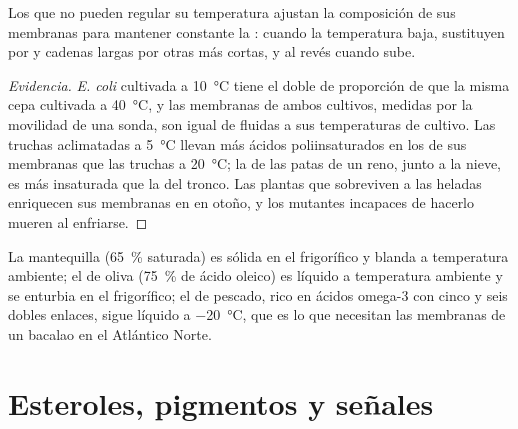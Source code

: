 \begin{proposition}\label{prop:b1:lipids:homeoviscous}
Los  que no pueden regular su temperatura ajustan la composición
de sus membranas para mantener constante la : cuando la temperatura
baja, sustituyen  por  y cadenas largas
por otras más cortas, y al revés cuando sube.
\end{proposition}
\begin{proof}[Evidencia]
\emph{E. coli} cultivada a \qty{10}{\celsius} tiene el doble de proporción
de  que la misma cepa cultivada a
\qty{40}{\celsius}, y las membranas de ambos cultivos, medidas por la
movilidad de una sonda, son igual de fluidas a sus temperaturas de
cultivo. Las truchas aclimatadas a \qty{5}{\celsius} llevan más ácidos
poliinsaturados en los  de sus membranas que las truchas a
\qty{20}{\celsius}; la  de las patas de un reno, junto a la nieve, es
más insaturada que la del tronco. Las plantas que sobreviven a las heladas
enriquecen sus membranas en   en otoño, y los mutantes
incapaces de hacerlo mueren al enfriarse.
\end{proof}

\begin{example}\label{ex:b1:lipids:kitchen}
La mantequilla (\qty{65}{\%} saturada) es sólida en el frigorífico y blanda
a temperatura ambiente; el  de oliva (\qty{75}{\%} de ácido oleico) es
líquido a temperatura ambiente y se enturbia en el frigorífico; el  de
pescado, rico en ácidos omega-3 con cinco y seis dobles enlaces, sigue
líquido a \qty{-20}{\celsius}, que es lo que necesitan las membranas de un
bacalao en el Atlántico Norte.
\end{example}

\section{Esteroles, pigmentos y señales}

